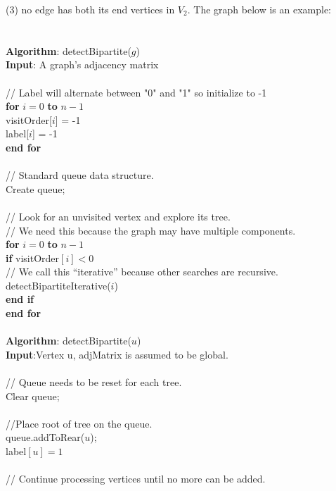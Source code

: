 \documentclass{article}
\begin{document}
	(3) no edge has both its end vertices in $V_2$. The graph below is an example:\\
	\\
	\\
	\textbf{Algorithm}: detectBipartite($g$) \\
	\textbf{Input}: A graph's adjacency matrix\\
	\\
	// Label will alternate between "0" and "1" so initialize to -1 \\
	\textbf{for} $i=0$ \textbf{to} $n-1$\\
	\indent visitOrder[$i$] = -1 \\ 
	\indent label[$i$] = -1 \\
	\textbf{end for} \\
	\\
	// Standard queue data structure. \\
	Create queue; \\
	\\
	// Look for an unvisited vertex and explore its tree.  \\
	// We need this because the graph may have multiple components. \\
	\textbf{for} $i=0$ \textbf{to} $n-1$ \\
	\indent \textbf{if} visitOrder$[i] < 0$ \\
	\indent \indent // We call this ``iterative'' because other searches are recursive. \\
	\indent \indent detectBipartiteIterative($i$) \\
	\indent \textbf{end if} \\
	\textbf{end for} \\
	\\
	\textbf{Algorithm}: detectBipartite($u$) \\
	\textbf{Input}:Vertex u, adjMatrix is assumed to be global.\\
	\\
	\indent // Queue needs to be reset for each tree. \\
	\indent Clear queue; \\
	\\
	\indent //Place root of tree on the queue. \\
	\indent queue.addToRear($u$); \\
	\indent label$[u] = 1$ \\
	\\
	\indent // Continue processing vertices until no more can be added. \\
\end{document}
